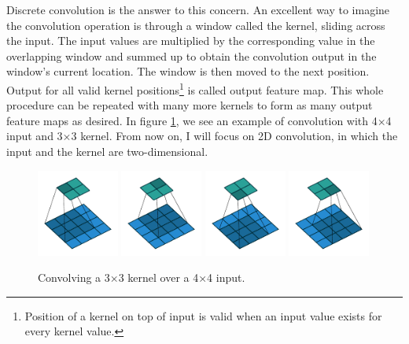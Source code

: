 Discrete convolution is the answer to this concern. An excellent way to imagine the convolution operation is through a window called the kernel, sliding across the input. The input values are multiplied by the corresponding value in the overlapping window and summed up to obtain the convolution output in the window's current location. The window is then moved to the next position. Output for all valid kernel positions\footnote{Position of a kernel on top of input is valid when an input value exists for every kernel value.} is called output feature map. This whole procedure can be repeated with many more kernels to form as many output feature maps as desired. In figure \ref{fig:convolution_slide}, we see an example of convolution with 4×4 input and 3×3 kernel. From now on, I will focus on 2D convolution, in which the input and the kernel are two-dimensional.

\begin{figure}[ht]
    \centering
    \includegraphics[width=0.24\textwidth]{images/no_padding_no_strides_00.pdf}
    \includegraphics[width=0.24\textwidth]{images/no_padding_no_strides_01.pdf}
    \includegraphics[width=0.24\textwidth]{images/no_padding_no_strides_02.pdf}
    \includegraphics[width=0.24\textwidth]{images/no_padding_no_strides_03.pdf}
    \caption[2D convolution with 4×4 and 3×3 kernel]{\label{fig:convolution_slide}
    Convolving a 3×3 kernel over a 4×4 input. \cite{convolutionguide}}
\end{figure}

